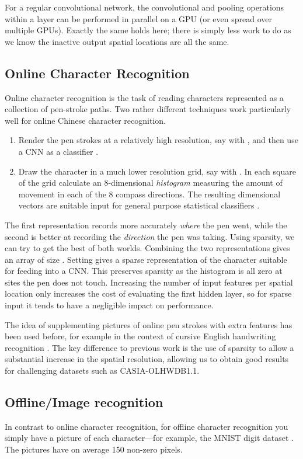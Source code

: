 \documentclass{article}
\numberwithin{equation}{subsection}
\newenvironment{circlist}{
  \begin{enumerate}[]
  \setlength{\itemsep}{0pt}
  \setlength{\parskip}{0pt}
  \setlength{\parsep}{0pt}
}{\end{enumerate}}
\begin{document}
For a regular convolutional network, the convolutional and pooling operations within a layer can be performed in parallel on a GPU (or even spread over multiple GPUs). Exactly the same holds here; there is simply less work to do as we know the inactive output spatial locations are all the same.

\subsection{Online Character Recognition}\label{onlinecr}
Online character recognition is the task of reading characters represented as a collection of pen-stroke paths. Two rather different techniques work particularly well for online Chinese character recognition.
\begin{circlist}
\item Render the pen strokes at a relatively high resolution, say  with , and then use a CNN as a classifier \cite{multicolumndeep}.
\item Draw the character in a much lower resolution grid, say  with . In each square of the grid calculate an 8-dimensional {\em histogram} measuring the amount of movement in each of the 8 compass directions. The resulting  dimensional vectors are suitable input for general purpose statistical classifiers \cite{bb104561}.
\end{circlist}
The first representation records more accurately {\em where} the pen went, while the second is better at recording the {\em direction} the pen was taking.
Using sparsity, we can try to get the best of both worlds. Combining the two representations gives an array of size . Setting  gives a sparse representation of the character suitable for feeding into a CNN.
This preserves sparsity as the histogram is all zero at sites the pen does not touch. Increasing the number of input features per spatial location only increases the cost of evaluating the first hidden layer, so for sparse input it tends to have a negligible impact on performance.

The idea of supplementing pictures of online pen strokes with extra features has been used before, for example in the context of cursive English handwriting recognition \cite{lecun-bengio-94}. The key difference to previous work is the use of sparsity to allow a substantial increase in the spatial resolution, allowing us to obtain good results for challenging datasets such as CASIA-OLHWDB1.1.


\subsection{Offline/Image recognition}\label{offlinecr}
In contrast to online character recognition, for offline character recognition you simply have a picture of each character---for example, the MNIST digit dataset \cite{mnistlecun}. The  pictures have on average 150 non-zero pixels.
\end{document}
